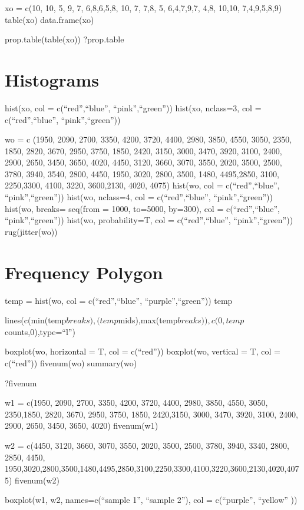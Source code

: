 \documentclass[
]{article}
\begin{document}
xo = c(10, 10, 5, 9, 7, 6,8,6,5,8, 10, 7, 7,8, 5, 6,4,7,9,7, 4,8, 10,10,
7,4,9,5,8,9) table(xo) data.frame(xo)

prop.table(table(xo)) ?prop.table

\section{Histograms}\label{histograms}

hist(xo, col = c(``red'',``blue'', ``pink'',``green'')) hist(xo,
nclass=3, col = c(``red'',``blue'', ``pink'',``green''))

wo = c (1950, 2090, 2700, 3350, 4200, 3720, 4400, 2980, 3850, 4550,
3050, 2350, 1850, 2820, 3670, 2950, 3750, 1850, 2420, 3150, 3000, 3470,
3920, 3100, 2400, 2900, 2650, 3450, 3650, 4020, 4450, 3120, 3660, 3070,
3550, 2020, 3500, 2500, 3780, 3940, 3540, 2800, 4450, 1950, 3020, 2800,
3500, 1480, 4495,2850, 3100, 2250,3300, 4100, 3220, 3600,2130, 4020,
4075) hist(wo, col = c(``red'',``blue'', ``pink'',``green'')) hist(wo,
nclass=4, col = c(``red'',``blue'', ``pink'',``green'')) hist(wo,
breaks= seq(from = 1000, to=5000, by=300), col = c(``red'',``blue'',
``pink'',``green'')) hist(wo, probability=T, col = c(``red'',``blue'',
``pink'',``green'')) rug(jitter(wo))

\section{Frequency Polygon}\label{frequency-polygon}

temp = hist(wo, col = c(``red'',``blue'', ``purple'',``green'')) temp

lines(c(min(temp\(breaks), (temp\)mids),max(temp\(breaks)), c(0,temp\)counts,0),type=``l'')

boxplot(wo, horizontal = T, col = c(``red'')) boxplot(wo, vertical = T,
col = c(``red'')) fivenum(wo) summary(wo)

?fivenum

w1 = c(1950, 2090, 2700, 3350, 4200, 3720, 4400, 2980, 3850, 4550, 3050,
2350,1850, 2820, 3670, 2950, 3750, 1850, 2420,3150, 3000, 3470, 3920,
3100, 2400, 2900, 2650, 3450, 3650, 4020) fivenum(w1)

w2 = c(4450, 3120, 3660, 3070, 3550, 2020, 3500, 2500, 3780, 3940, 3340,
2800, 2850, 4450,
1950,3020,2800,3500,1480,4495,2850,3100,2250,3300,4100,3220,3600,2130,4020,4075)
fivenum(w2)

boxplot(w1, w2, names=c(``sample 1'', ``sample 2''), col = c(``purple'',
``yellow'' ))
\end{document}
